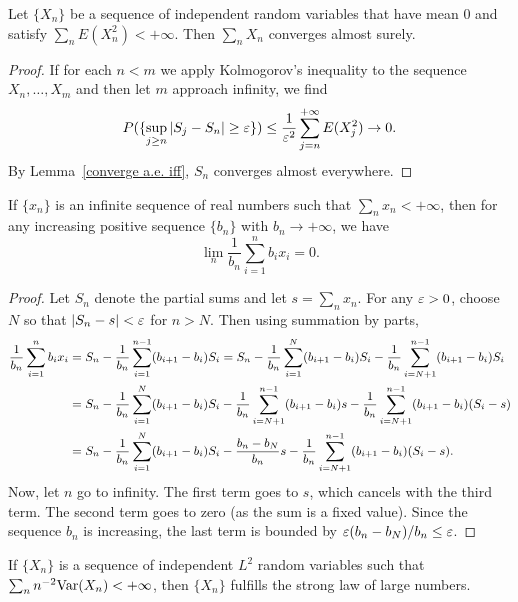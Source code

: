 \begin{proposition}\label{variance converge imply converge series}
Let $\{X_n\}$ be a sequence of independent random variables that have mean $0$ and satisfy $\sum_nE(X_n^2)<+\infty$. Then $\sum_nX_n$ converges almost surely.
\end{proposition}
\begin{proof}
If for each $n<m$ we apply Kolmogorov's inequality to the sequence $X_n,\dots,X_m$ and then let $m$ approach infinity, we find
\[P(\{\sup_{j\geq n}|S_j-S_n|\geq\varepsilon\})\leq\frac{1}{\varepsilon^2}\sum_{j=n}^{+\infty}E(X_j^2)\to 0.\]
By Lemma~\ref{converge a.e. iff}, $S_n$ converges almost everywhere.
\end{proof}
\begin{lemma}
If $\{x_n\}$ is an infinite sequence of real numbers such that $\sum_nx_n<+\infty$, then for any increasing positive sequence $\{b_n\}$ with $b_n\to+\infty$, we have
\[\lim_n\frac{1}{b_n}\sum_{i=1}^{n}b_ix_i=0.\]
\end{lemma}
\begin{proof}
Let $S_n$ denote the partial sums and let $s=\sum_nx_n$. For any $\varepsilon>0$, choose $N$ so that $|S_n-s|<\varepsilon$ for $n>N$. Then using summation by parts,
\begin{equation*}\small
\begin{aligned}
\frac{1}{b_n}\sum_{i=1}^{n}b_ix_i&=S_n-\frac{1}{b_n}\sum_{i=1}^{n-1}(b_{i+1}-b_i)S_i=S_n-\frac{1}{b_n}\sum_{i=1}^{N}(b_{i+1}-b_i)S_i-\frac{1}{b_n}\sum_{i=N+1}^{n-1}(b_{i+1}-b_i)S_i\\
&=S_n-\frac{1}{b_n}\sum_{i=1}^{N}(b_{i+1}-b_i)S_i-\frac{1}{b_n}\sum_{i=N+1}^{n-1}(b_{i+1}-b_i)s-\frac{1}{b_n}\sum_{i=N+1}^{n-1}(b_{i+1}-b_i)(S_i-s)\\
&=S_n-\frac{1}{b_n}\sum_{i=1}^{N}(b_{i+1}-b_i)S_i-\frac{b_n-b_N}{b_n}s-\frac{1}{b_n}\sum_{i=N+1}^{n-1}(b_{i+1}-b_i)(S_i-s).
\end{aligned}
\end{equation*}
Now, let $n$ go to infinity. The first term goes to $s$, which cancels with the third term. The second term goes to zero (as the sum is a fixed value). Since the sequence $b_n$ is increasing, the last term is bounded by $\varepsilon(b_n-b_N)/b_n\leq\varepsilon$.
\end{proof}
\begin{theorem}\label{Kolmogorov's Strong Law of Large Numbers}
If $\{X_n\}$ is a sequence of independent $L^2$ random variables such that $\sum_{n}n^{-2}\mathrm{Var}(X_n)<+\infty$, then $\{X_n\}$ fulfills the strong law of large numbers.
\end{theorem}
